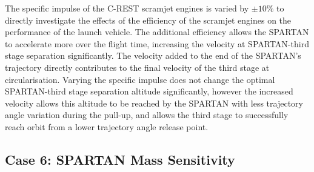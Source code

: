 The specific impulse of the C-REST scramjet engines is varied by $\pm10\%$ to directly investigate the effects of the efficiency of the scramjet engines on the performance of the launch vehicle. 
The additional efficiency allows the SPARTAN to accelerate more over the flight time, increasing the velocity at SPARTAN-third stage separation significantly. The velocity added to the end of the SPARTAN's trajectory directly contributes to the final velocity of the third stage at circularisation. Varying the specific impulse does not change the optimal SPARTAN-third stage separation altitude significantly, however the increased velocity allows this altitude to be reached by the SPARTAN with less trajectory angle variation during the pull-up, and allows the third stage to successfully reach orbit from a lower trajectory angle release point.




\subsection{Case 6: SPARTAN Mass Sensitivity}\label{sec:SpartanMassnoreturn}



